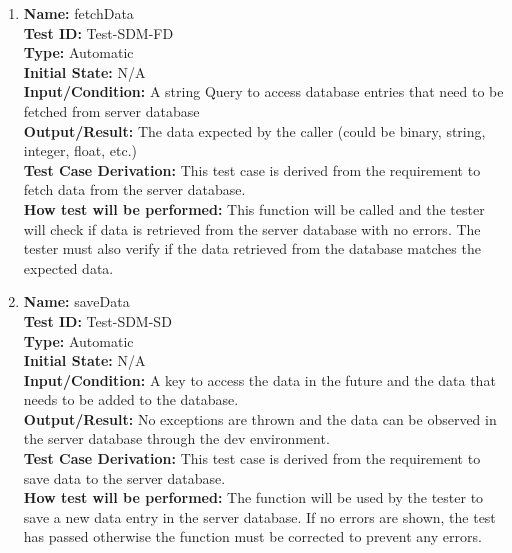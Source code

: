\documentclass[12pt, titlepage]{article}
\begin{document}
\begin{enumerate}

  \item \textbf{Name:} fetchData \label{itm:Test-SDM-FD} \\
        \textbf{Test ID:} Test-SDM-FD \\
        \textbf{Type:} Automatic \\
        \textbf{Initial State:} N/A \\
        \textbf{Input/Condition:} A string Query to access database entries that need to be fetched from server database \\
        \textbf{Output/Result:} The data expected by the caller (could be binary, string, integer, float, etc.) \\
        \textbf{Test Case Derivation:} This test case is derived from the requirement to fetch data from the server database. \\
        \textbf{How test will be performed:} This function will be called and the tester will check if data is retrieved from the server database with no errors. The tester must also verify if the data retrieved from the database matches the expected data. \\

  \item \textbf{Name:} saveData \label{itm:Test-SDM-SD} \\
        \textbf{Test ID:} Test-SDM-SD \\
        \textbf{Type:} Automatic \\
        \textbf{Initial State:} N/A \\
        \textbf{Input/Condition:} A key to access the data in the future and the data that needs to be added to the database. \\
        \textbf{Output/Result:} No exceptions are thrown and the data can be observed in the server database through the dev environment. \\
        \textbf{Test Case Derivation:} This test case is derived from the requirement to save data to the server database. \\
        \textbf{How test will be performed:} The function will be used by the tester to save a new data entry in the server database. If no errors are shown, the test has passed otherwise the function must be corrected to prevent any errors. \\


\end{enumerate}
\end{document}
